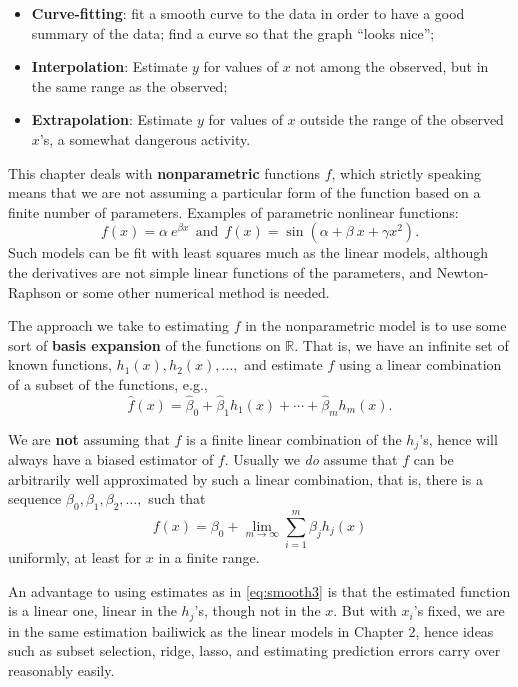 \documentclass[
]{book}
\begin{document}
\begin{itemize}
\item
  \textbf{Curve-fitting}: fit a smooth curve to the data in order to have a good summary of the data; find a curve so that the graph ``looks nice'';
\item
  \textbf{Interpolation}: Estimate \(y\) for values of \(x\) not among the observed, but in the same range as the observed;
\item
  \textbf{Extrapolation}: Estimate \(y\) for values of \(x\) outside the range of the observed \(x\)'s, a somewhat dangerous activity.
\end{itemize}

This chapter deals with \textbf{nonparametric} functions \(f\), which strictly speaking means that we are not assuming a particular form of the function based on a finite number of parameters. Examples of parametric nonlinear functions:
\begin{equation}
f(x) = \alpha~e^{\beta x}~~\text{and}~~f(x) =\sin(\alpha+\beta~x+\gamma x^2).
\label{eq:smooth2}
\end{equation}
Such models can be fit with least squares much as the linear models, although the derivatives are not simple linear functions of the parameters, and Newton-Raphson or some other numerical method is needed.

The approach we take to estimating \(f\) in the nonparametric model is to use some sort of \textbf{basis expansion} of the functions on \(\mathbb{R}\). That is, we have an infinite set of known functions, \(h_1(x), h_2(x),\ldots,\) and estimate \(f\) using a linear combination of a subset of the functions, e.g.,
\begin{equation}
\widehat f(x) = \widehat{\beta}_0+\widehat{\beta}_1 h_1(x) +\cdots+\widehat{\beta}_m h_m(x).
\label{eq:smooth3}
\end{equation}

We are \textbf{not} assuming that \(f\) is a finite linear combination of the \(h_j\)'s, hence will always have a biased estimator of \(f\). Usually we \emph{do} assume that \(f\) can be arbitrarily well approximated by such a linear combination, that is, there is a sequence \(\beta_0,\beta_1,\beta_2,\ldots,\) such that
\begin{equation}
f(x) = \beta_0+\lim_{m\to\infty}\sum_{i=1}^m \beta_j h_j(x)
\label{eq:smooth4}
\end{equation}
uniformly, at least for \(x\) in a finite range.

An advantage to using estimates as in \eqref{eq:smooth3} is that the estimated function is a linear one, linear in the \(h_j\)'s, though not in the \(x\). But with \(x_i\)'s fixed, we are in the same estimation bailiwick as the linear models in Chapter 2, hence ideas such as subset selection, ridge, lasso, and estimating prediction errors carry over reasonably easily.
\end{document}
